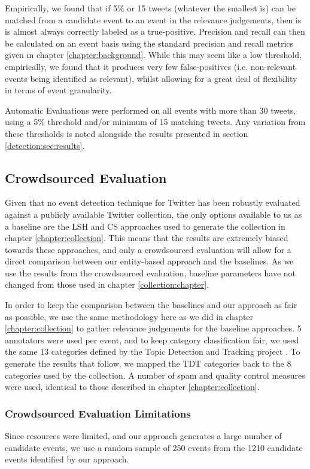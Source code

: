 Empirically, we found that if 5\% or 15 tweets (whatever the smallest is) can be matched from a candidate event to an event in the relevance judgements, then is is almost always correctly labeled as a true-positive.
Precision and recall can then be calculated on an event basis using the standard precision and recall metrics given in chapter \ref{chapter:background}.
While this may seem like a low threshold, empirically, we found that it produces very few false-positives (i.e. non-relevant events being identified as relevant), whilst allowing for a great deal of flexibility in terms of event granularity.

Automatic Evaluations were performed on all events with more than 30 tweets, using a 5\% threshold and/or minimum of 15 matching tweets.
Any variation from these thresholds is noted alongside the results presented in section \ref{detection:sec:results}.

\subsection{Crowdsourced Evaluation}
\label{sec:baseline}
\label{detection:sec:crowd}
Given that no event detection technique for Twitter has been robustly evaluated against a publicly available Twitter collection, the only options available to us as a baseline are the LSH \citep{Petrovic10} and CS \citep{Aggarwal12} approaches used to generate the collection in chapter \ref{chapter:collection}.
This means that the results are extremely biased towards these approaches, and only a crowdsourced evaluation will allow for a direct comparison between our entity-based approach and the baselines.
As we use the results from the crowdsourced evaluation, baseline parameters have not changed from those used in chapter \ref{collection:chapter}.

In order to keep the comparison between the baselines and our approach as fair as possible, we use the same methodology here as we did in chapter \ref{chapter:collection} to gather relevance judgements for the baseline approaches.
5 annotators were used per event, and to keep category classification fair, we used the same 13 categories defined by the Topic Detection and Tracking project \citep{Allan:2002:ITD:772260.772262}.
To generate the results that follow, we mapped the TDT categories back to the 8 categories used by the collection.
A number of spam and quality control measures were used, identical to those described in chapter \ref{chapter:collection}.

\subsubsection{Crowdsourced Evaluation Limitations}
Since resources were limited, and our approach generates a large number of candidate events, we use a random sample of 250 events from the 1210 candidate events identified by our approach.

